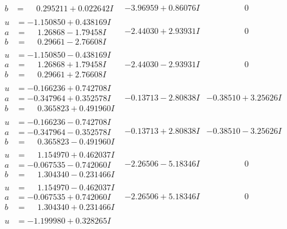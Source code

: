 \documentclass[1p]{elsarticle_modified}
\theoremstyle{definition}
\begin{document}
$$\begin{array}{c|c|c}
\begin{aligned}
b &= \phantom{-}0.295211 + 0.022642 I\end{aligned}
 & -3.96959 + 0.86076 I & \phantom{-0.000000 } 0 \\ \hline\begin{aligned}
u &= -1.150850 + 0.438169 I \\
a &= \phantom{-}1.26868 - 1.79458 I \\
b &= \phantom{-}0.29661 - 2.76608 I\end{aligned}
 & -2.44030 + 2.93931 I & \phantom{-0.000000 } 0 \\ \hline\begin{aligned}
u &= -1.150850 - 0.438169 I \\
a &= \phantom{-}1.26868 + 1.79458 I \\
b &= \phantom{-}0.29661 + 2.76608 I\end{aligned}
 & -2.44030 - 2.93931 I & \phantom{-0.000000 } 0 \\ \hline\begin{aligned}
u &= -0.166236 + 0.742708 I \\
a &= -0.347964 + 0.352578 I \\
b &= \phantom{-}0.365823 + 0.491960 I\end{aligned}
 & -0.13713 - 2.80838 I & -0.38510 + 3.25626 I \\ \hline\begin{aligned}
u &= -0.166236 - 0.742708 I \\
a &= -0.347964 - 0.352578 I \\
b &= \phantom{-}0.365823 - 0.491960 I\end{aligned}
 & -0.13713 + 2.80838 I & -0.38510 - 3.25626 I \\ \hline\begin{aligned}
u &= \phantom{-}1.154970 + 0.462037 I \\
a &= -0.067535 - 0.742060 I \\
b &= \phantom{-}1.304340 - 0.231466 I\end{aligned}
 & -2.26506 - 5.18346 I & \phantom{-0.000000 } 0 \\ \hline\begin{aligned}
u &= \phantom{-}1.154970 - 0.462037 I \\
a &= -0.067535 + 0.742060 I \\
b &= \phantom{-}1.304340 + 0.231466 I\end{aligned}
 & -2.26506 + 5.18346 I & \phantom{-0.000000 } 0 \\ \hline\begin{aligned}
u &= -1.199980 + 0.328265 I \\

\end{aligned}
\end{array}$$
\end{document}
